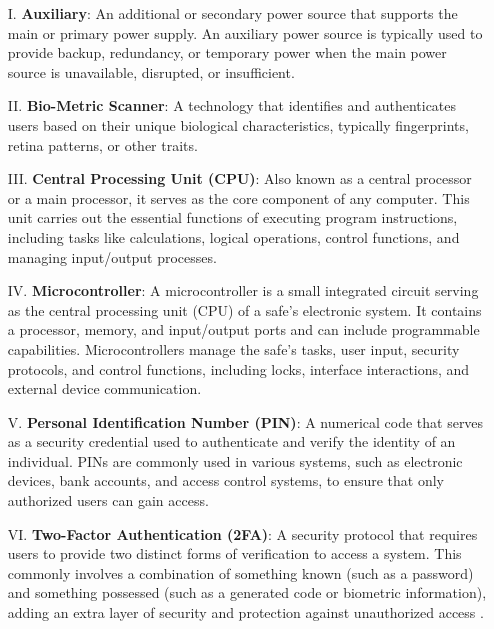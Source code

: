 \documentclass{article}
\begin{document}
\begin{enumerate}
    \item[I.] \textbf{Auxiliary}: An additional or secondary power source that supports the main or primary power supply. An auxiliary power source is typically used to provide backup, redundancy, or temporary power when the main power source is unavailable, disrupted, or insufficient.
    \item[II.] \textbf{Bio-Metric Scanner}: A technology that identifies and authenticates users based on their unique biological characteristics, typically fingerprints, retina patterns, or other traits.
    \item[III.] \textbf{Central Processing Unit (CPU)}: Also known as a central processor or a main processor, it serves as the core component of any computer. This unit carries out the essential functions of executing program instructions, including tasks like calculations, logical operations, control functions, and managing input/output processes.
    \item[IV.] \textbf{Microcontroller}: A microcontroller is a small integrated circuit serving as the central processing unit (CPU) of a safe's electronic system. It contains a processor, memory, and input/output ports and can include programmable capabilities. Microcontrollers manage the safe's tasks, user input, security protocols, and control functions, including locks, interface interactions, and external device communication.
    \item[V.] \textbf{Personal Identification Number (PIN)}: A numerical code that serves as a security credential used to authenticate and verify the identity of an individual. PINs are commonly used in various systems, such as electronic devices, bank accounts, and access control systems, to ensure that only authorized users can gain access.
    \item[VI.] \textbf{Two-Factor Authentication (2FA)}: A security protocol that requires users to provide two distinct forms of verification to access a system. This commonly involves a combination of something known (such as a password) and something possessed (such as a generated code or biometric information), adding an extra layer of security and protection against unauthorized access \cite{identityautomationTwoFactorAuthentication}.
\end{enumerate}
\end{document}
